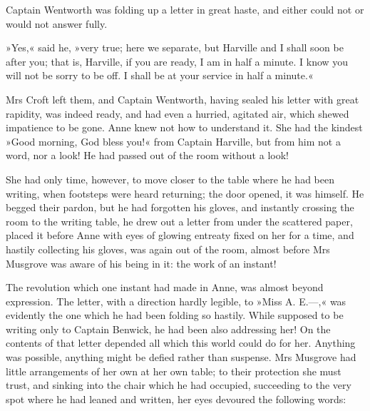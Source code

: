 Captain Wentworth was folding up a letter in great haste, and either could not or would not answer fully.

»Yes,« said he, »very true; here we separate, but Harville and I shall soon be after you; that is, Harville, if you are ready, I am in half a minute. I know you will not be sorry to be off. I shall be at your service in half a minute.«

Mrs Croft left them, and Captain Wentworth, having sealed his letter with great rapidity, was indeed ready, and had even a hurried, agitated air, which shewed impatience to be gone. Anne knew not how to understand it. She had the kindest »Good morning, God bless you!« from Captain Harville, but from him not a word, nor a look! He had passed out of the room without a look!

She had only time, however, to move closer to the table where he had been writing, when footsteps were heard returning; the door opened, it was himself. He begged their pardon, but he had forgotten his gloves, and instantly crossing the room to the writing table, he drew out a letter from under the scattered paper, placed it before Anne with eyes of glowing entreaty fixed on her for a time, and hastily collecting his gloves, was again out of the room, almost before Mrs Musgrove was aware of his being in it: the work of an instant!

The revolution which one instant had made in Anne, was almost beyond expression. The letter, with a direction hardly legible, to »Miss A. E.—,« was evidently the one which he had been folding so hastily. While supposed to be writing only to Captain Benwick, he had been also addressing her! On the contents of that letter depended all which this world could do for her. Anything was possible, anything might be defied rather than suspense. Mrs Musgrove had little arrangements of her own at her own table; to their protection she must trust, and sinking into the chair which he had occupied, succeeding to the very spot where he had leaned and written, her eyes devoured the following words:

